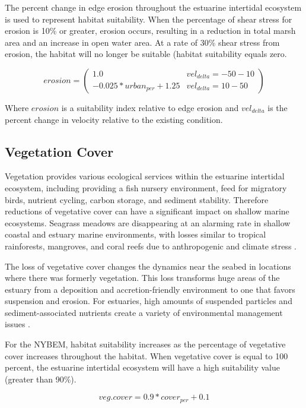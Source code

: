 \documentclass[
]{book}
\begin{document}
The percent change in edge erosion throughout the estuarine intertidal ecosystem is used to represent habitat suitability. When the percentage of shear stress for erosion is 10\% or greater, erosion occurs, resulting in a reduction in total marsh area and an increase in open water area. At a rate of 30\% shear stress from erosion, the habitat will no longer be suitable (habitat suitability equals zero.

\[erosion = \begin{pmatrix} 1.0 & vel_{delta}=-50-10\\
-0.025*urban_{per}+1.25 & vel_{delta}=10-50
\end{pmatrix}\]

Where \(erosion\) is a suitability index relative to edge erosion and \(vel_{delta}\) is the percent change in velocity relative to the existing condition.

\hypertarget{vegetation-cover}{%
\subsection{Vegetation Cover}\label{vegetation-cover}}

Vegetation provides various ecological services within the estuarine intertidal ecosystem, including providing a fish nursery environment, feed for migratory birds, nutrient cycling, carbon storage, and sediment stability. Therefore reductions of vegetative cover can have a significant impact on shallow marine ecosystems. Seagrass meadows are disappearing at an alarming rate in shallow coastal and estuary marine environments, with losses similar to tropical rainforests, mangroves, and coral reefs due to anthropogenic and climate stress \citep{walter_large-scale_2020}.

The loss of vegetative cover changes the dynamics near the seabed in locations where there was formerly vegetation. This loss transforms huge areas of the estuary from a deposition and accretion-friendly environment to one that favors suspension and erosion. For estuaries, high amounts of suspended particles and sediment-associated nutrients create a variety of environmental management issues \citep{cotton_effects_2006}.

For the NYBEM, habitat suitability increases as the percentage of vegetative cover increases throughout the habitat. When vegetative cover is equal to 100 percent, the estuarine intertidal ecosystem will have a high suitability value (greater than 90\%).

\[veg.cover = 0.9*cover_{per}+0.1\]
\end{document}

